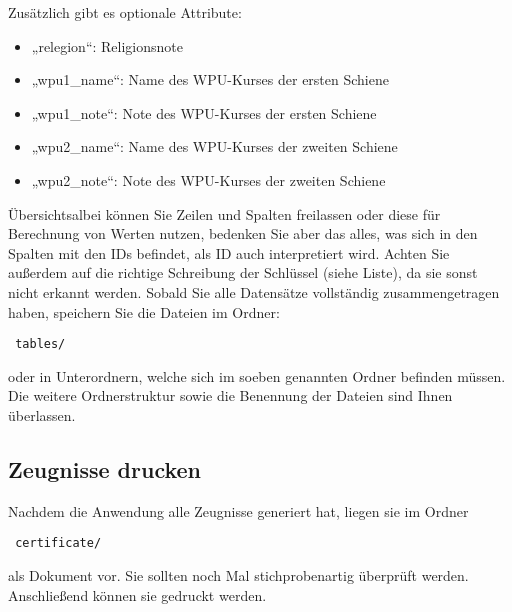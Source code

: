 \documentclass[a4paper,10pt]{scrartcl}
\begin{document}
      Zusätzlich gibt es optionale Attribute:
      \begin{itemize}
         \item „relegion“: Religionsnote
         \item „wpu1\_name“: Name des WPU-Kurses der ersten Schiene
         \item „wpu1\_note“: Note des WPU-Kurses der ersten Schiene
	 \item „wpu2\_name“: Name des WPU-Kurses der zweiten Schiene
         \item „wpu2\_note“: Note des WPU-Kurses der zweiten Schiene
      \end{itemize}
      Übersichtsalbei können Sie Zeilen und Spalten freilassen oder diese für Berechnung von Werten nutzen, bedenken Sie aber das alles, was sich in den Spalten mit den IDs befindet, als ID auch interpretiert wird.\newline
      Achten Sie außerdem auf die richtige Schreibung der Schlüssel (siehe Liste), da sie sonst nicht erkannt werden. \newline
      Sobald Sie alle Datensätze vollständig zusammengetragen haben, speichern Sie die Dateien im Ordner:
      \begin{verbatim} tables/  \end{verbatim} 
      oder in Unterordnern, welche sich im soeben genannten Ordner befinden müssen. Die weitere Ordnerstruktur sowie die Benennung der Dateien sind Ihnen überlassen.
   \subsection{Zeugnisse drucken}
      Nachdem die Anwendung alle Zeugnisse generiert hat, liegen sie im Ordner
      \begin{verbatim} certificate/  \end{verbatim}
      als Dokument vor. Sie sollten noch Mal stichprobenartig überprüft werden. Anschließend können sie gedruckt werden.
\end{document}
